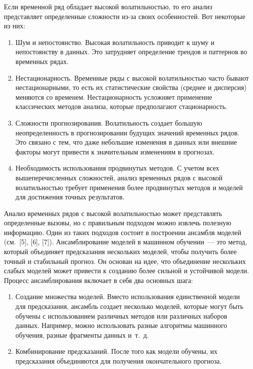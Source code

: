 \documentclass[a4paper,12pt]{article}
\begin{document}
Если временной ряд обладает высокой волатильностью, то его анализ представляет определенные сложности из-за своих особенностей. Вот некоторые из них:
\medskip
\begin{enumerate}
	\item Шум и непостоянство. Высокая волатильность приводит к шуму и непостоянству в данных. Это затрудняет определение трендов и паттернов во временных рядах.
	\item Нестационарность. Временные ряды с высокой волатильностью часто бывают нестационарными, то есть их статистические свойства (среднее и дисперсия) меняются со временем. Нестационарность усложняет применение классических методов анализа, которые предполагают стационарность.
	\item Сложности прогнозирования. Волатильность создает большую неопределенность в прогнозировании будущих значений временных рядов. Это связано с тем, что даже небольшие изменения в данных или внешние факторы могут привести к значительным изменениям в прогнозах.
	\item Необходимость использования продвинутых методов. С учетом всех вышеперечисленных сложностей, анализ временных рядов с высокой волатильностью требует применения более продвинутых методов и моделей для достижения точных результатов.
\end{enumerate}
\medskip
Анализ временных рядов с высокой волатильностью может представлять определенные вызовы, но с правильным подходом можно извлечь полезную информацию. Один из таких подходов состоит в построении ансамбля моделей (см. [5], [6], [7]).
Ансамблирование моделей в машинном обучении — это метод, который объединяет предсказания нескольких моделей, чтобы получить более точный и стабильный прогноз. Он основан на идее, что объединение нескольких слабых моделей может привести к созданию более сильной и устойчивой модели. Процесс ансамблирования включает в себя два основных шага:
\medskip
\begin{enumerate}
	\item Создание множества моделей. Вместо использования единственной модели для предсказания, ансамбль создает несколько моделей, которые могут быть обучены с использованием различных методов или различных наборов данных. Например, можно использовать разные алгоритмы машинного обучения, разные фрагменты данных и т. д.
	\item Комбинирование предсказаний. После того как модели обучены, их предсказания объединяются для получения окончательного прогноза. 
\end{enumerate}
\end{document}
